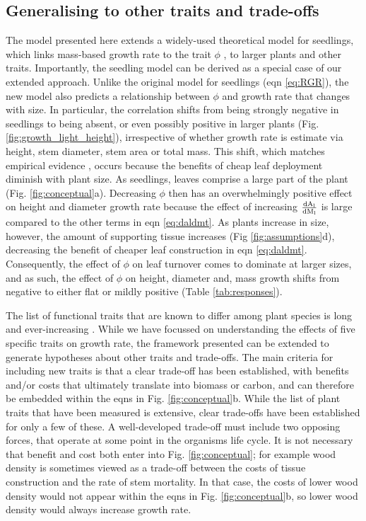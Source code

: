 \documentclass[a4paper,11pt]{article}
\begin{document}
\subsection{Generalising to other traits and trade-offs}

The model presented here extends a widely-used theoretical model for seedlings, which links mass-based growth rate to the trait $\phi$ \citep{Lambers-1992, Wright-2000}, to larger plants and other traits. Importantly, the seedling model can be derived as a special case of our extended approach. Unlike the original model for seedlings (eqn \ref{eq:RGR}), the new model also predicts a relationship between $\phi$ and growth rate that changes with size. In particular, the correlation shifts from being strongly negative in seedlings to being absent, or even possibly positive in larger plants (Fig. \ref{fig:growth_light_height}), irrespective of whether growth rate is estimate via height, stem diameter, stem area or total mass. This shift, which matches empirical evidence \citep{Poorter-2008, Wright-2010, Herault-2011, Paine-2015, Gibert-2016}, occurs because the benefits of cheap leaf deployment diminish with plant size. As seedlings, leaves comprise a large part of the plant (Fig. \ref{fig:conceptual}a). Decreasing $\phi$ then has an overwhelmingly positive effect on height and diameter growth rate because the effect of increasing $\frac{\rm{d} A_{\rm l}}{\rm{d} M_{\rm l}}$ is large compared to the other terms in eqn \ref{eq:daldmt}. As plants increase in size, however, the amount of supporting tissue increases (Fig \ref{fig:assumptions}d), decreasing the benefit of cheaper leaf construction in eqn \ref{eq:daldmt}. Consequently, the effect of $\phi$ on leaf turnover comes to dominate at larger sizes, and as such, the effect of $\phi$ on height, diameter and, mass growth shifts from negative to either flat or mildly positive  (Table \ref{tab:responses}).

The list of functional traits that are known to differ among plant species is long and ever-increasing \citep{Perez-2013}. While we have focussed on understanding the effects of five specific traits on growth rate, the framework presented can be extended to generate hypotheses about other traits and trade-offs. The main criteria for including new traits is that a clear trade-off has been established, with benefits and/or costs that ultimately translate into biomass or carbon, and can therefore be embedded within the eqns in Fig. \ref{fig:conceptual}b. While the list of plant traits that have been measured is extensive, clear trade-offs have been established for only a few of these. A well-developed  trade-off must include two opposing forces, that operate at some point in the organisms life cycle. It is not necessary that benefit and cost both enter into Fig. \ref{fig:conceptual}; for example wood density is sometimes viewed as a trade-off between the costs of tissue construction and the rate of stem mortality. In that case, the costs of lower wood density would not appear within the eqns in Fig. \ref{fig:conceptual}b, so lower wood density would always increase growth rate.
\end{document}
